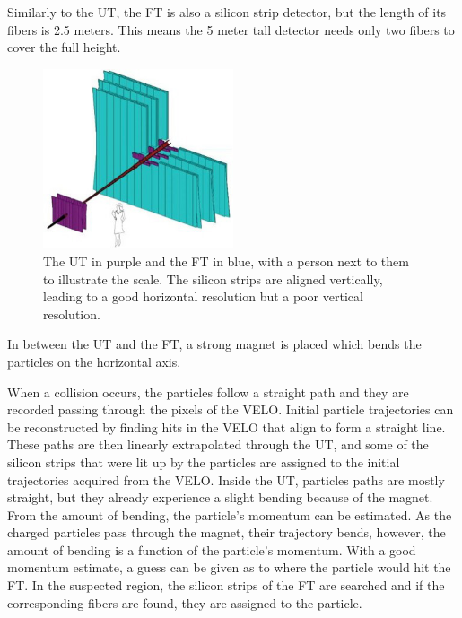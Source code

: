 \documentclass[12pt]{article}
\begin{document}
Similarly to the UT, the FT is also a silicon strip detector, but the length of its fibers is 2.5 meters. This means the 5 meter tall detector needs only two fibers to cover the full height.

\begin{figure}[H]
	\begin{center}
		\includegraphics[width=0.5\textwidth]{detector_ut_ft_drawing}
	\end{center}
	\caption{The UT in purple and the FT in blue, with a person next to them to illustrate the scale. The silicon strips are aligned vertically, leading to a good horizontal resolution but a poor vertical resolution.}
	\label{fig_detector_ut_ft_drawing}
\end{figure}

In between the UT and the FT, a strong magnet is placed which bends the particles on the horizontal axis.

When a collision occurs, the particles follow a straight path and they are recorded passing through the pixels of the VELO. Initial particle trajectories can be reconstructed by finding hits in the VELO that align to form a straight line. These paths are then linearly extrapolated through the UT, and some of the silicon strips that were lit up by the particles are assigned to the initial trajectories acquired from the VELO. Inside the UT, particles paths are mostly straight, but they already experience a slight bending because of the magnet. From the amount of bending, the particle's momentum can be estimated. As the charged particles pass through the magnet, their trajectory bends, however, the amount of bending is a function of the particle's momentum. With a good momentum estimate, a guess can be given as to where the particle would hit the FT. In the suspected region, the silicon strips of the FT are searched and if the corresponding fibers are found, they are assigned to the particle.
\end{document}
